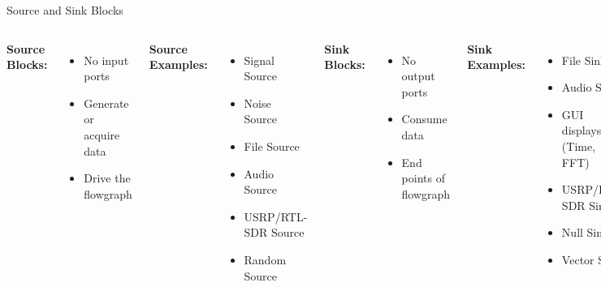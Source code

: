 \documentclass[aspectratio=169,11pt]{beamer}
\begin{document}
\begin{frame}{Source and Sink Blocks}
\begin{columns}
\textbf{Source Blocks:}
\begin{itemize}
    \item No input ports
    \item Generate or acquire data
    \item Drive the flowgraph
\end{itemize}

\textbf{Source Examples:}
\begin{itemize}
    \item Signal Source
    \item Noise Source
    \item File Source
    \item Audio Source
    \item USRP/RTL-SDR Source
    \item Random Source
\end{itemize}

\textbf{Sink Blocks:}
\begin{itemize}
    \item No output ports
    \item Consume data
    \item End points of flowgraph
\end{itemize}

\textbf{Sink Examples:}
\begin{itemize}
    \item File Sink
    \item Audio Sink
    \item GUI displays (Time, FFT)
    \item USRP/RTL-SDR Sink
    \item Null Sink
    \item Vector Sink
\end{itemize}
\end{columns}
\end{frame}
\end{document}
